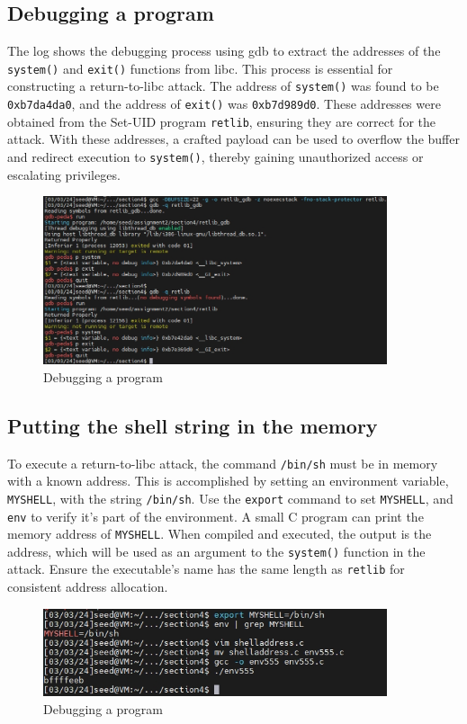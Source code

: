 \documentclass[a4paper,11pt]{article}
\begin{document}
\subsection{Debugging a program}
The log shows the debugging process using gdb to extract the addresses of the \verb|system()| and \verb|exit()| functions from libc. This process is essential for constructing a return-to-libc attack. The address of \verb|system()| was found to be \verb|0xb7da4da0|, and the address of \verb|exit()| was \verb|0xb7d989d0|. These addresses were obtained from the Set-UID program \verb|retlib|, ensuring they are correct for the attack. With these addresses, a crafted payload can be used to overflow the buffer and redirect execution to \verb|system()|, thereby gaining unauthorized access or escalating privileges.
\begin{figure}[h]
    \centering
       \includegraphics[width=0.9\textwidth]{figures/task17/task17.png}
    \caption{Debugging a program}\label{fig:task17}
\end{figure}


\subsection{Putting the shell string in the memory}
To execute a return-to-libc attack, the command \verb|/bin/sh| must be in memory with a known address. This is accomplished by setting an environment variable, \verb|MYSHELL|, with the string \verb|/bin/sh|. Use the \verb|export| command to set \verb|MYSHELL|, and \verb|env| to verify it's part of the environment. A small C program can print the memory address of \verb|MYSHELL|. When compiled and executed, the output is the address, which will be used as an argument to the \verb|system()| function in the attack. Ensure the executable's name has the same length as  \verb|retlib| for consistent address allocation.
\begin{figure}[h]
    \centering
       \includegraphics[width=0.9\textwidth]{figures/task18/task18.png}
    \caption{Debugging a program}\label{fig:task18}
\end{figure}
\end{document}
